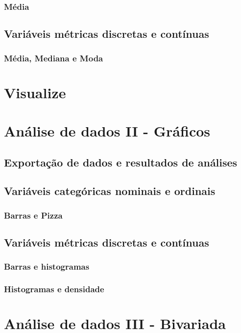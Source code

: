 \documentclass[a4paper,12pt]{article}
\begin{document}
\subsubsection*{Média}

\subsection*{Variáveis métricas discretas e contínuas}
\subsubsection*{Média, Mediana e Moda}

\section{Visualize}
\section*{Análise de dados II - Gráficos}

\subsection*{Exportação de dados e resultados de análises}
\subsection*{Variáveis categóricas nominais e ordinais}
\subsubsection*{Barras e Pizza}

\subsection*{Variáveis métricas discretas e contínuas}
\subsubsection*{Barras e histogramas}
\subsubsection*{Histogramas e densidade}

\section*{Análise de dados III - Bivariada}
\end{document}
